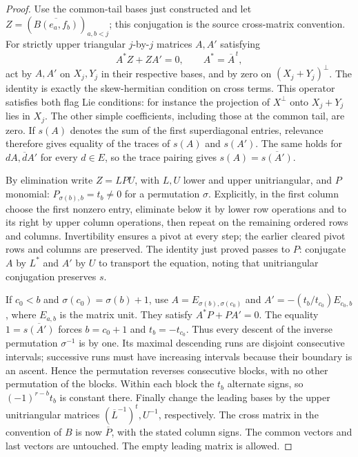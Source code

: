 \begin{proof}
Use the common-tail bases just constructed and let
\(Z=(\overline{B(e_a,f_b)})_{a,b<j}\); this conjugation
is the source cross-matrix convention. For strictly
upper triangular \(j\)-by-\(j\) matrices \(A,A'\)
satisfying
\[
 A^*Z+ZA'=0,\qquad A^*=\overline A^{\,t},
\]
act by \(A,A'\) on \(X_j,Y_j\) in their respective
bases, and by zero on \((X_j+Y_j)^\perp\).
The identity is exactly the skew-hermitian condition
on cross terms. This operator satisfies both flag
Lie conditions: for instance the projection of
\(X^\perp\) onto \(X_j+Y_j\) lies in \(X_j\).
The other simple coefficients, including those at
the common tail, are zero. If \(s(A)\) denotes the
sum of the first superdiagonal entries, relevance
therefore gives equality of the traces of
\(s(A)\) and \(s(A')\).
The same holds for \(dA,\overline d A'\) for every
\(d\in E\), so the trace pairing gives
\(s(A)=\overline{s(A')}\).

By elimination write \(Z=LPU\), with \(L,U\) lower
and upper unitriangular, and \(P\) monomial:
\(P_{\sigma(b),b}=t_b\ne0\) for a permutation
\(\sigma\). Explicitly, in the first column choose
the first nonzero entry, eliminate below it by lower
row operations and to its right by upper column
operations, then repeat on the remaining ordered
rows and columns. Invertibility ensures a pivot at
every step; the earlier cleared pivot rows and columns
are preserved. The identity just proved passes to \(P\):
conjugate \(A\) by \(L^*\) and \(A'\) by \(U\) to
transport the equation, noting that unitriangular
conjugation preserves \(s\).

If \(c_0<b\) and \(\sigma(c_0)=\sigma(b)+1\), use
\(A=E_{\sigma(b),\sigma(c_0)}\) and
\(A'=-(t_b/t_{c_0})E_{c_0,b}\), where \(E_{a,b}\)
is the matrix unit. They satisfy \(A^*P+PA'=0\).
The equality \(1=\overline{s(A')}\) forces
\(b=c_0+1\) and \(t_b=-t_{c_0}\).
Thus every descent of the inverse permutation
\(\sigma^{-1}\) is by one. Its maximal descending
runs are disjoint consecutive intervals; successive
runs must have increasing intervals because their
boundary is an ascent. Hence the permutation
reverses consecutive blocks, with no other
permutation of the blocks. Within each block the
\(t_b\) alternate signs, so
\((-1)^{r-b}t_b\) is constant there.
Finally change the leading bases by the upper
unitriangular matrices
\((\overline L^{-1})^t,U^{-1}\), respectively.
The cross matrix in the convention of \(B\) is now
\(\overline P\), with the stated column signs.
The common vectors and last vectors are untouched.
The empty leading matrix is allowed.
\end{proof}

